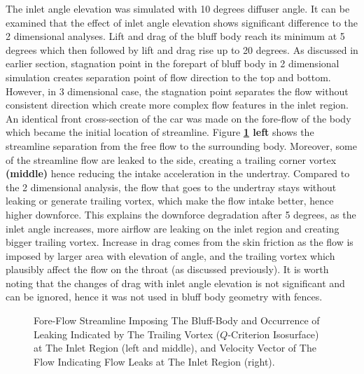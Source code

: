 \noindent The inlet angle elevation was simulated with 10 degrees diffuser angle. It can be examined that the effect of inlet angle elevation shows significant difference to the 2 dimensional analyses. Lift and drag of the bluff body reach its minimum at 5 degrees which then followed by lift and drag rise up to 20 degrees. As discussed in earlier section, stagnation point in the forepart of bluff body in 2 dimensional simulation creates separation point of flow direction to the top and bottom. However, in 3 dimensional case, the stagnation point separates the flow without consistent direction which create more complex flow features in the inlet region. An identical front cross-section of the car was made on the fore-flow of the body which became the initial location of streamline. Figure \textbf{\ref{fig:3D_OF_INLET_COMPARE} left} shows the streamline separation from the free flow to the surrounding body. Moreover, some of the streamline flow are leaked to the side, creating a trailing corner vortex \textbf{(middle)} hence reducing the intake acceleration in the undertray.  Compared to the 2 dimensional analysis, the flow that goes to the undertray stays without leaking or generate trailing vortex, which make the flow intake better, hence higher downforce. This explains the downforce degradation after 5 degrees, as the inlet angle increases, more airflow are leaking on the inlet region and creating bigger trailing vortex. Increase in drag comes from the skin friction as the flow is imposed by larger area with elevation of angle, and the trailing vortex which plausibly affect the flow on the throat (as discussed previously). It is worth noting that the changes of drag with inlet angle elevation is not significant and can be ignored, hence it was not used in  bluff body geometry with fences.

\begin{figure}[!htb]
    \centering
    \noindent{}
    \caption{Fore-Flow Streamline Imposing The Bluff-Body and Occurrence of Leaking Indicated by The Trailing Vortex ($Q$-Criterion Isosurface) at The Inlet Region (left and middle), and Velocity Vector of The Flow Indicating Flow Leaks at The Inlet Region (right).} 
    \label{fig:3D_OF_INLET_COMPARE}
\end{figure}

